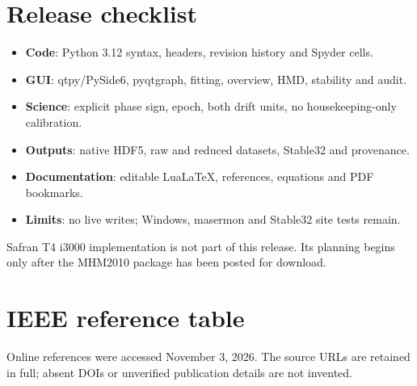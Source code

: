 \documentclass[11pt,a4paper]{article}
\begin{document}
\section{Release checklist}
\begin{itemize}
\item \textbf{Code}: Python 3.12 syntax, headers, revision history and Spyder cells.
\item \textbf{GUI}: qtpy/PySide6, pyqtgraph, fitting, overview, HMD, stability and audit.
\item \textbf{Science}: explicit phase sign, epoch, both drift units, no housekeeping-only calibration.
\item \textbf{Outputs}: native HDF5, raw and reduced datasets, Stable32 and provenance.
\item \textbf{Documentation}: editable LuaLaTeX, references, equations and PDF bookmarks.
\item \textbf{Limits}: no live writes; Windows, masermon and Stable32 site tests remain.
\end{itemize}

Safran T4 i3000 implementation is not part of this release. Its planning begins
only after the MHM2010 package has been posted for download.

\section{IEEE reference table}
Online references were accessed November 3, 2026. The source URLs are retained
in full; absent DOIs or unverified publication details are not invented.
\end{document}
